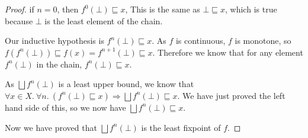 \begin{proof}
if $n = 0$, then $f^0(\bot) \sqsubseteq x$, This is the same as $\bot \sqsubseteq x$, which is true because $\bot$ is the least element of the chain.

Our inductive hypothesis is $f^n(\bot) \sqsubseteq x$. As $f$ is continuous, $f$ is monotone, so $f(f^n(\bot)) \sqsubseteq f(x) = f^{n+1}(\bot) \sqsubseteq x$. Therefore we know that for any element $f^n(\bot)$ in the chain, $f^n(\bot) \sqsubseteq x$. 

As $\bigsqcup f^n (\bot)$ is a least upper bound, we know that  $\forall x \in X. \  \forall n. \ (f^n(\bot) \sqsubseteq x) \Rightarrow \bigsqcup f^n (\bot) \sqsubseteq x$. We have just proved the left hand side of this, so we now have $\bigsqcup f^n (\bot) \sqsubseteq x$.

\vspace{0.5cm}

Now we have proved that $\bigsqcup f^n (\bot)$ is the least fixpoint of $f$.
\end{proof}